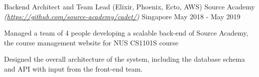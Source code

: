 \begin{cventries}
  \cventry
  {Backend Architect and Team Lead (Elixir, Phoenix, Ecto, AWS)} %
  {Source Academy \textmd{\em\tiny(\url{https://github.com/source-academy/cadet/})}} %
  {Singapore} %
  {May 2018 - May 2019} %
  {
    \begin{cvitems}
      \item {Managed a team of 4 people developing a scalable back-end of Source Academy, the course management website for NUS CS1101S course}
      \item {Designed the overall architecture of the system, including the database schema and API with input from the front-end team.}
    \end{cvitems}
  }

\end{cventries}
